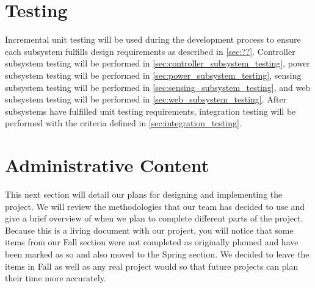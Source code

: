 \documentclass[12pt]{article}
\begin{document}
\section{Testing}                               %
Incremental unit testing will be used during the development process
to ensure each subsystem fulfills design requirements as described in
\autoref{sec:??}. Controller subsystem testing will be performed in
\autoref{sec:controller_subsystem_testing}, power subsystem testing will be
performed in \autoref{sec:power_subsystem_testing}, sensing subsystem testing
will be performed in \autoref{sec:sensing_subsystem_testing}, and web subsystem
testing will be performed in \autoref{sec:web_subsystem_testing}. After
subsystems have fulfilled unit testing requirements, integration testing will
be performed with the criteria defined in \autoref{sec:integration_testing}.

\section{Administrative Content}                %
This next section will detail our plans for designing and implementing the project. We will review the methodologies that our team has decided to use and give a brief overview of when we plan to complete different parts of the project. Because this is a living document with our project, you will notice that some items from our Fall section were not completed as originally planned and have been marked as so and also moved to the Spring section. We decided to leave the items in Fall as well as any real project would so that future projects can plan their time more accurately. 
\clearpage
{}
\end{document}
